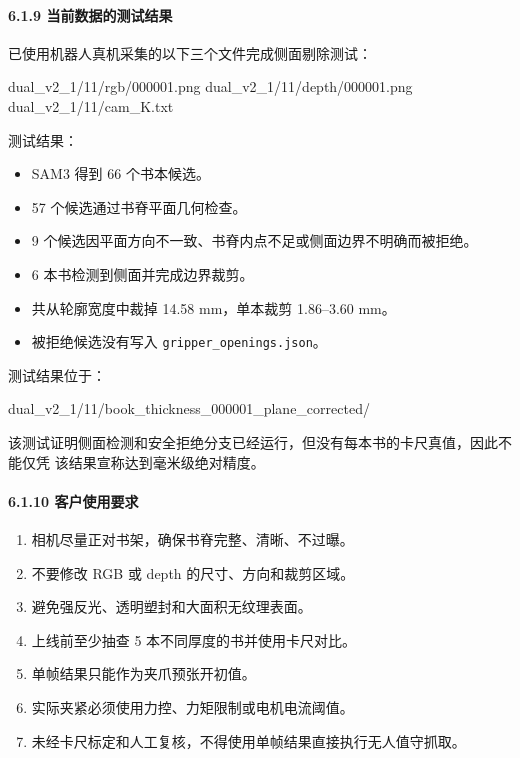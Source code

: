 \documentclass[
  chinese,
  11pt,
  a4paper,
]{article}
\newenvironment{Shaded}{\begin{snugshade}}{\end{snugshade}}
\newcommand{\NormalTok}[1]{#1}
\providecommand{\tightlist}{%
  \setlength{\itemsep}{0pt}\setlength{\parskip}{0pt}}
\begin{document}
\paragraph{6.1.9
当前数据的测试结果}\label{619-ux5f53ux524dux6570ux636eux7684ux6d4bux8bd5ux7ed3ux679c}

已使用机器人真机采集的以下三个文件完成侧面剔除测试：

\begin{Shaded}
\begin{Highlighting}[]
\NormalTok{dual\_v2\_1/11/rgb/000001.png}
\NormalTok{dual\_v2\_1/11/depth/000001.png}
\NormalTok{dual\_v2\_1/11/cam\_K.txt}
\end{Highlighting}
\end{Shaded}

测试结果：

\begin{itemize}
\tightlist
\item
  SAM3 得到 66 个书本候选。
\item
  57 个候选通过书脊平面几何检查。
\item
  9 个候选因平面方向不一致、书脊内点不足或侧面边界不明确而被拒绝。
\item
  6 本书检测到侧面并完成边界裁剪。
\item
  共从轮廓宽度中裁掉 14.58 mm，单本裁剪 1.86--3.60 mm。
\item
  被拒绝候选没有写入 \texttt{gripper\_openings.json}。
\end{itemize}

测试结果位于：

\begin{Shaded}
\begin{Highlighting}[]
\NormalTok{dual\_v2\_1/11/book\_thickness\_000001\_plane\_corrected/}
\end{Highlighting}
\end{Shaded}

该测试证明侧面检测和安全拒绝分支已经运行，但没有每本书的卡尺真值，因此不能仅凭
该结果宣称达到毫米级绝对精度。

\paragraph{6.1.10
客户使用要求}\label{6110-ux5ba2ux6237ux4f7fux7528ux8981ux6c42}

\begin{enumerate}
\def\labelenumi{\arabic{enumi}.}
\tightlist
\item
  相机尽量正对书架，确保书脊完整、清晰、不过曝。
\item
  不要修改 RGB 或 depth 的尺寸、方向和裁剪区域。
\item
  避免强反光、透明塑封和大面积无纹理表面。
\item
  上线前至少抽查 5 本不同厚度的书并使用卡尺对比。
\item
  单帧结果只能作为夹爪预张开初值。
\item
  实际夹紧必须使用力控、力矩限制或电机电流阈值。
\item
  未经卡尺标定和人工复核，不得使用单帧结果直接执行无人值守抓取。
\end{enumerate}
\end{document}
